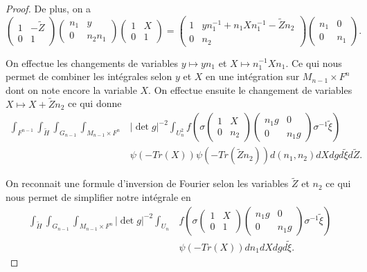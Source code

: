 \documentclass{amsart}
\begin{document}
\begin{proof}
De plus, on a
\begin{equation}
\begin{pmatrix}
1 & -\tilde{Z} \\
0 & 1
\end{pmatrix}  \begin{pmatrix}
n_1 & y \\
0 & n_2n_1
\end{pmatrix} \begin{pmatrix}
1 & X \\
0 & 1
\end{pmatrix} = \begin{pmatrix}
1 & yn_1^{-1} + n_1Xn_1^{-1} - \tilde{Z}n_2\\
0 & n_2
\end{pmatrix}\begin{pmatrix}
n_1 & 0\\
0 & n_1
\end{pmatrix}.
\end{equation}

On effectue les changements de variables $y \mapsto yn_1$ et $X \mapsto n_1^{-1}Xn_1$. Ce qui nous permet de combiner les intégrales selon $y$ et $X$ en une intégration sur $M_{n-1} \times F^n$ dont on note encore la variable $X$. On effectue ensuite le changement de variables $X \mapsto X + \tilde{Z}n_2$ ce qui donne
\begin{equation}
\begin{split}
\int_{F^{n-1}} \int_{\tilde{H}} \int_{G_{n-1}} \int_{M_{n-1} \times F^n}  & |\det g|^{-2}\int_{U_n^2} f\left(\sigma \begin{pmatrix}
1 & X \\
0 & n_2
\end{pmatrix} \begin{pmatrix}
n_1g & 0 \\
0 & n_1g
\end{pmatrix} \sigma^{-1} \tilde{\xi}\right) \\
& \psi(-Tr(X)) \psi(-Tr(\tilde{Z}n_2))  d(n_1,n_2) dX dg d\tilde{\xi} d\tilde{Z}.
\end{split}
\end{equation}

On reconnait une formule d'inversion de Fourier selon les variables $\tilde{Z}$ et $n_2$ ce qui nous permet de simplifier notre intégrale en
\begin{equation}
\begin{split}
\int_{\tilde{H}} \int_{G_{n-1}} \int_{M_{n-1} \times F^n}  |\det g|^{-2}\int_{U_n} & f\left(\sigma \begin{pmatrix}
1 & X \\
0 & 1
\end{pmatrix} \begin{pmatrix}
n_1g & 0 \\
0 & n_1g
\end{pmatrix} \sigma^{-1} \tilde{\xi}\right) \\
& \psi(-Tr(X))  dn_1 dX dg d\tilde{\xi}.
\end{split}
\end{equation}


\end{proof}
\end{document}
